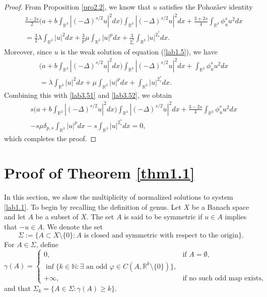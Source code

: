 \begin{proof}
From Proposition \ref{pro2.2}, we know that $u$ satisfies the Pohoz\v{a}ev identity
\begin{equation}\label{lab3.51}
\begin{split}
&\frac{3-2s}{2}\Big(a+b\int_{\mathbb{R}^3}|(-\Delta)^{s/2}u|^2dx\Big)
 \int_{\mathbb{R}^3}|(-\Delta)^{s/2}u|^2dx
 +\frac{3+2s}{4}\int_{\mathbb{R}^3}\phi^s_u u^2dx\\
&=\frac{3}{2}\lambda \int_{\mathbb{R}^3}|u|^2dx
 + \frac{3}{p}\mu \int_{\mathbb{R}^3}|u|^pdx
 +\frac{3}{2^*_s}\int_{\mathbb{R}^3}|u|^{2^*_s}dx.
\end{split}
\end{equation}
Moreover, since $u$ is the weak solution of equation ({\ref{lab1.5}}), we have
\begin{equation}\label{lab3.52}
\begin{split}
&\Big(a+b\int_{\mathbb{R}^3}|(-\Delta)^{s/2}u|^2dx\Big)
 \int_{\mathbb{R}^3}|(-\Delta)^{s/2}u|^2dx
 +\int_{\mathbb{R}^3}\phi^s_u u^2dx\\
&=\lambda \int_{\mathbb{R}^3}|u|^2dx+\mu \int_{\mathbb{R}^3}|u|^pdx
 +\int_{\mathbb{R}^3}|u|^{2^*_s}dx.
\end{split}
\end{equation}
Combining this with \eqref{lab3.51} and \eqref{lab3.52}, we obtain
\begin{align*}
&s\Big(a+b\int_{\mathbb{R}^3}|(-\Delta)^{s/2}u|^2dx\Big)
 \int_{\mathbb{R}^3}|(-\Delta)^{s/2}u|^2dx
 +\frac{3-2s}{4}\int_{\mathbb{R}^3}\phi^s_u u^2dx\\
&-s\mu \delta_{p,s}\int_{\mathbb{R}^3}|u|^pdx-s\int_{\mathbb{R}^3}|u|^{2^*_s}dx=0,
\end{align*}
which completes the proof.
\end{proof}

\section{Proof of Theorem \ref{thm1.1}}
In this section, we show the multiplicity of normalized solutions to  system \eqref{lab1.1}.
To begin by recalling the definition of genus.
Let $X$ be a Banach space and let $A$ be a subset of $X$. The set $A$ is said to be
symmetric if $u\in A$ implies that $-u\in A$. We denote the set
$$
\Sigma :=\{A\subset X\setminus \{0\}: A \text{ is closed and symmetric with respect
 to the origin}\}.
$$
For $A\in\Sigma$, define
\[
\gamma(A) =
\begin{cases}
0, & \text{if } A = \emptyset, \\
\inf\{k \in \mathbb{N}: \exists \text{ an odd }
\varphi \in C(A, \mathbb{R}^k \setminus \{0\})\}, \\
+\infty,& \text{if no such odd map exists,}
\end{cases}
\]
and that $\Sigma_k=\{A\in \Sigma:\gamma(A)\geq k\}$.

